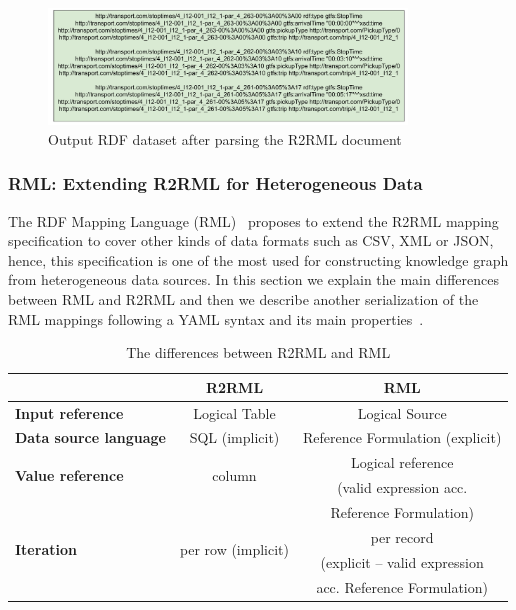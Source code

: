 \begin{figure}[!ht]
\centering
\includegraphics[width=0.85\textwidth]{figures/state-of-the-art/RDF from Stop_times.pdf}
\caption{Output RDF dataset after parsing the R2RML document}
\label{fig:soa_rdf}
\end{figure}



\subsubsection{RML: Extending R2RML for Heterogeneous Data}
The RDF Mapping Language (RML)~\citep{dimou2014rml} proposes to extend the R2RML mapping specification to cover other kinds of data formats such as CSV, XML or JSON, hence, this specification is one of the most used for constructing knowledge graph from heterogeneous data sources. In this section we explain the main differences between RML and R2RML and then we describe another serialization of the RML mappings following a YAML syntax and its main properties~\citep{Heyvaert2018Declarative}.


\begin{table}[!ht]
\centering
\caption{The differences between R2RML and RML}
\label{tab:soa_rmlvsr2rml}
\begin{tabular}{l|c|c}
                                          & \textbf{R2RML}                      & \textbf{RML}                         \\
\hline                                          
\textbf{Input reference}                  & Logical Table                       & Logical Source                       \\
\hline
\textbf{Data source language}             & SQL (implicit)                      & Reference Formulation (explicit)     \\
\hline
\multirow{2}{*}{\textbf{Value reference}} & \multirow{2}{*}{column}             & Logical reference \\
                                          &                                     & (valid expression acc. \\
                                          &                                     & Reference Formulation) \\
\hline                                          
\multirow{2}{*}{\textbf{Iteration}}       & \multirow{2}{*}{per row (implicit)} & per record        \\
                                          &                                     & (explicit -- valid expression        \\
                                          &                                     & acc. Reference Formulation)
\end{tabular}
\end{table}


